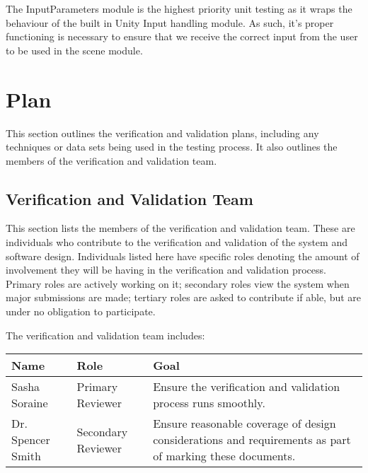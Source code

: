 \documentclass[12pt, titlepage]{article}
\begin{document}
The InputParameters module is the highest priority unit testing as it wraps the 
behaviour of the built in Unity Input handling module. As such, it's proper 
functioning is necessary to ensure that we receive the correct input from the 
user to be used in the scene module.

\section{Plan}
This section outlines the verification and validation plans, including any 
techniques or data sets being used in the testing process. It also outlines the 
members of the verification and validation team.

\subsection{Verification and Validation Team}
This section lists the members of the verification and validation team. These 
are individuals who contribute to the verification and validation of the system 
and software design. Individuals listed here have specific roles denoting the 
amount of involvement they will be having in the verification and validation 
process. Primary roles are actively working on it; secondary roles view the 
system when major submissions are made; tertiary roles are asked to contribute 
if able, but are under no obligation to participate.

The verification and validation team includes:

\begin{table}[h]
	\begin{tabular}{|l|l|p{8cm}|}
		\hline
		\textbf{Name} & \textbf{Role} & \textbf{Goal} \\
		\hline
		Sasha Soraine & Primary Reviewer& Ensure the verification and 
		validation process runs smoothly.\\
		Dr. Spencer Smith & Secondary Reviewer& Ensure reasonable coverage of 
		design considerations and requirements as part of marking these 
		documents. \\
		\hline
	\end{tabular}
\end{table}
\end{document}
